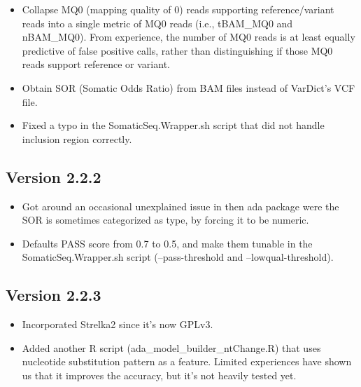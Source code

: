 \documentclass[10pt,letterpaper]{article}
\begin{document}
\begin{sloppypar}
\begin{itemize}
  \item
  Collapse MQ0 (mapping quality of 0) reads supporting reference/variant reads into a single metric of MQ0 reads (i.e., tBAM\_MQ0 and nBAM\_MQ0). From experience, the number of MQ0 reads is at least equally predictive of false positive calls, rather than distinguishing if those MQ0 reads support reference or variant. 
  
  \item
  Obtain SOR (Somatic Odds Ratio) from BAM files instead of VarDict's VCF file.
  
  \item
  Fixed a typo in the SomaticSeq.Wrapper.sh script that did not handle inclusion region correctly.
  
\end{itemize}



\subsection{Version 2.2.2}

\begin{itemize}

  \item
  Got around an occasional unexplained issue in then ada package were the SOR is sometimes categorized as type, by forcing it to be numeric. 
  
  \item
  Defaults PASS score from 0.7 to 0.5, and make them tunable in the SomaticSeq.Wrapper.sh script (--pass-threshold and --lowqual-threshold). 
  
\end{itemize}



\subsection{Version 2.2.3}

\begin{itemize}

  \item
  Incorporated Strelka2 since it's now GPLv3.
  
  \item
  Added another R script (ada\_model\_builder\_ntChange.R) that uses nucleotide substitution pattern as a feature. Limited experiences have shown us that it improves the accuracy, but it's not heavily tested yet. 


\end{itemize}
\end{sloppypar}
\end{document}
